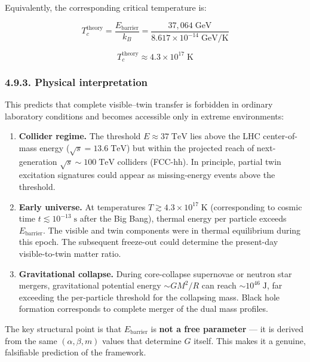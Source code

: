 \documentclass[
  11pt,
]{article}
\begin{document}
Equivalently, the corresponding critical temperature is:

\[T_c^{\text{theory}} = \frac{E_{\text{barrier}}}{k_B} = \frac{37{,}064\;\text{GeV}}{8.617 \times 10^{-14}\;\text{GeV/K}} \tag{204}\]

\[\boxed{T_c^{\text{theory}} \approx 4.3 \times 10^{17}\;\text{K}} \tag{205}\]

\hypertarget{physical-interpretation-1}{%
\subsubsection{4.9.3. Physical
interpretation}\label{physical-interpretation-1}}

This predicts that complete visible--twin transfer is forbidden in
ordinary laboratory conditions and becomes accessible only in extreme
environments:

\begin{enumerate}
\def\labelenumi{\arabic{enumi}.}
\item
  \textbf{Collider regime.} The threshold \(E \approx 37\;\text{TeV}\)
  lies above the LHC center-of-mass energy
  (\(\sqrt{s} = 13.6\;\text{TeV}\)) but within the projected reach of
  next-generation \(\sqrt{s} \sim 100\;\text{TeV}\) colliders (FCC-hh).
  In principle, partial twin excitation signatures could appear as
  missing-energy events above the threshold.
\item
  \textbf{Early universe.} At temperatures
  \(T \gtrsim 4.3 \times 10^{17}\;\text{K}\) (corresponding to cosmic
  time \(t \lesssim 10^{-13}\;\text{s}\) after the Big Bang), thermal
  energy per particle exceeds \(E_{\text{barrier}}\). The visible and
  twin components were in thermal equilibrium during this epoch. The
  subsequent freeze-out could determine the present-day visible-to-twin
  matter ratio.
\item
  \textbf{Gravitational collapse.} During core-collapse supernovae or
  neutron star mergers, gravitational potential energy \(\sim GM^2/R\)
  can reach \(\sim 10^{46}\;\text{J}\), far exceeding the per-particle
  threshold for the collapsing mass. Black hole formation corresponds to
  complete merger of the dual mass profiles.
\end{enumerate}

The key structural point is that \(E_{\text{barrier}}\) is \textbf{not a
free parameter} --- it is derived from the same \((\alpha, \beta, m)\)
values that determine \(G\) itself. This makes it a genuine, falsifiable
prediction of the framework.
\end{document}
